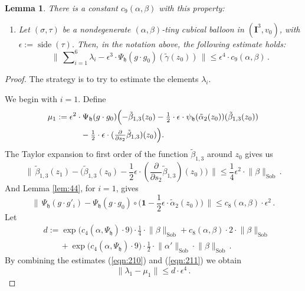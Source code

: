 \documentclass[10pt, a4paper]{amsart}
\newtheorem{lem}[equation]{Lemma}
\theoremstyle{definition}
\numberwithin{equation}{section}
\newcommand{\opn}{\operatorname}
\newcommand{\rmitem}[1]{\item[\text{\textup{(#1)}}]}
\newcommand{\mfrak}[1]{\mathfrak{#1}}
\newcommand{\mbf}[1]{\mathbf{#1}}
\newcommand{\mrm}[1]{\mathrm{#1}}
\newcommand{\smfrac}[2]{{\textstyle \frac{#1}{#2}}}
\newcommand{\bsym}[1]{\boldsymbol{#1}}
\newcommand{\bosum}{\sum\nolimits}
\newcommand{\til}[1]{\tilde{#1}}
\newcommand{\norm}[1]{\lVert #1 \rVert}
\newcommand{\Norm}[1]{\bigl\lVert\, #1 \, \bigr\rVert}
\newcommand{\h}{\mfrak{h}}
\begin{document}
\begin{lem} \label{lem:43}
There is a constant $c_9(\alpha, \beta)$ with this property:
\begin{enumerate}
\rmitem{$*$} Let $(\sigma, \tau)$ be a nondegenerate $(\alpha, \beta)$-tiny 
cubical balloon in $(\mbf{I}^3, v_0)$, with 
$\epsilon := \opn{side}(\tau)$. 
Then, in the notation above, the following estimate holds:
\[ \Norm{ \bosum_{i = 1}^6 \lambda_i
- \epsilon^3 \cdot \Psi_{\h}(g \cdot g_0)(\til{\gamma}(z_0)) } 
\leq \epsilon^4 \cdot c_9(\alpha, \beta) \, . \]
\end{enumerate}
\end{lem}

\begin{proof}
The strategy is to try to estimate the elements $\lambda_i$.

We begin with $i = 1$. Define
\[ \begin{aligned}
& \mu_1 := \epsilon^2 \cdot \Psi_{\h}(g \cdot g_0) \Bigl(
- \til{\beta}_{1, 3}(z_0) 
- \smfrac{1}{2} \cdot \epsilon \cdot
\psi_{\h}(\til{\alpha}_2(z_0))(\til{\beta}_{1, 3}(z_0)) \\
& \qquad \qquad
- \smfrac{1}{2} \cdot \epsilon \cdot 
(\smfrac{\partial}{\partial s_2} \til{\beta}_{1, 3})(z_0) \Bigr) .
\end{aligned} \]
The Taylor expansion to first order of the function $\til{\beta}_{1, 3}$ around
$z_0$ gives us
\begin{equation} \label{eqn:210}
\Norm{ \til{\beta}_{1, 3}(z_1) - \bigl( \til{\beta}_{1, 3}(z_0)
- \smfrac{1}{2} \epsilon \cdot 
(\smfrac{\partial}{\partial s_2} \til{\beta}_{1, 3})(z_0) \bigr) }
\leq \smfrac{1}{4} \epsilon^2 \cdot \norm{\beta}_{\mrm{Sob}} \, . 
\end{equation}
And Lemma \ref{lem:44}, for $i = 1$, gives
\begin{equation} \label{eqn:211}
\Norm{ \Psi_{\h}(g \cdot g'_i) - 
\Psi_{\h}(g \cdot g_0) \circ 
\bigl( \bsym{1} - \smfrac{1}{2} \epsilon \cdot \til{\alpha}_2(z_0) \bigr) }
\leq c_8(\alpha, \beta) \cdot \epsilon^2 \, . 
\end{equation}
Let
\[ \begin{aligned}
& d := \exp \bigl( c_4(\alpha, \Psi_{\h}) \cdot 9 \bigr)
\cdot \smfrac{1}{4} \cdot \norm{\beta}_{\mrm{Sob}} +
c_8(\alpha, \beta) \cdot 2 \cdot \norm{\beta}_{\mrm{Sob}} \\
& \qquad  + \exp \bigl( c_4(\alpha, \Psi_{\h}) \cdot 9 \bigr) \cdot 
\smfrac{1}{2} \cdot \norm{\alpha'}_{\mrm{Sob}} \cdot
\norm{\beta}_{\mrm{Sob}} \, . 
\end{aligned} \]
By combining the estimates (\ref{eqn:210}) and (\ref{eqn:211})  we obtain
\begin{equation} \label{eqn:212}
\norm{ \lambda_1 - \mu_1 } \leq d \cdot \epsilon^4 \, .
\end{equation}


\end{proof}
\end{document}
